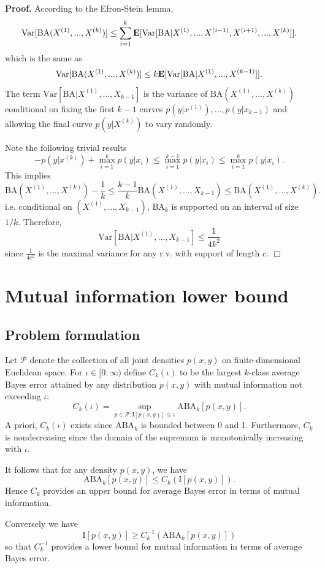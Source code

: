 \documentclass[12pt]{article}
\begin{document}
\noindent\textbf{Proof.}
According to the Efron-Stein lemma,
\[
\text{Var}[\text{BA}(X^{(1)},...,X^{(k)})] \leq \sum_{i=1}^k \textbf{E}[\text{Var}[\text{BA}|X^{(1)},...,X^{(i-1)}, X^{(i+1)}, ..., X^{(k)}]].
\]
which is the same as
\[
\text{Var}[\text{BA}(X^{(1)},...,X^{(k)})] \leq k \textbf{E}[\text{Var}[\text{BA}|X^{(1)},...,X^{(k-1)}]].
\]
The term $\text{Var}[\text{BA}|X^{(1)},...,X_{k-1}]$ is the variance of $\text{BA}(X^{(1)},...,X^{(k)})$
conditional on fixing the first $k-1$ curves $p(y|x^{(1)}),...,p(y|x_{k-1})$ and allowing the final curve $p(y|X^{(k)})$ to vary randomly.

Note the following trivial results
\[
-p(y|x^{(k)}) + \max_{i=1}^k p(y|x_i)\leq \max_{i=1}^{k-1} p(y|x_i) \leq \max_{i=1}^k p(y|x_i).
\]
This implies
\[
\text{BA}(X^{(1)},...,X^{(k)}) - \frac{1}{k} \leq \frac{k-1}{k}\text{BA}(X^{(1)},...,X_{k-1}) \leq \text{BA}(X^{(1)},...,X^{(k)}).
\]
i.e. conditional on $(X^{(1)},...,X_{k-1})$, $\text{BA}_k$ is supported on an interval of size $1/k$.
Therefore,
\[
\text{Var}[\text{BA}|X^{(1)},...,X_{k-1}] \leq \frac{1}{4k^2}
\]
since $\frac{1}{4c^2}$ is the maximal variance for any r.v. with support of length $c$. $\Box$

\section{Mutual information lower bound}

\subsection{Problem formulation}

Let $\mathcal{P}$ denote the collection of all joint densities $p(x,
y)$ on finite-dimensional Euclidean space.  For $\iota \in [0,\infty)$
define $C_k(\iota)$ to be the largest $k$-class average Bayes error
attained by any distribution $p(x,y)$ with mutual information not
exceeding $\iota$:
\[
C_k(\iota) = \sup_{p \in \mathcal{P}: \text{I}[p(x,y)] \leq \iota} \text{ABA}_k[p(x,y)].
\]
A priori, $C_k(\iota)$ exists since $\text{ABA}_k$ is bounded between
0 and 1.  Furthermore, $C_k$ is nondecreasing since the domain of the
supremum is monotonically increasing with $\iota$.

It follows that for any density $p(x,
y)$, we have
\[
\text{ABA}_k[p(x,y)] \leq C_k(\text{I}[p(x,y)]).
\]
Hence $C_k$ provides an upper bound for average Bayes error in terms of mutual information.

Conversely we have
\[
\text{I}[p(x,y)] \geq C^{-1}_k(\text{ABA}_k[p(x,y)])
\]
so that $C^{-1}_k$ provides a lower bound for mutual information in terms of average Bayes error.
\end{document}
